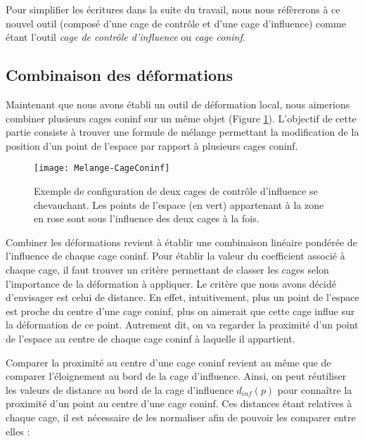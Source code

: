 Pour simplifier les écritures dans la suite du travail, nous nous réfèrerons à
ce nouvel outil (composé d'une cage de contrôle et d'une cage d'influence)
comme étant l'outil \textit{cage de contrôle d'influence} ou \textit{cage
coninf}.

\subsection{Combinaison des déformations}

Maintenant que nous avons établi un outil de déformation local, nous aimerions
combiner plusieurs cages coninf sur un même objet (Figure \ref{MELMC}).
L'objectif de cette partie consiste à trouver une formule de mélange
permettant la modification de la position d'un point de l'espace par rapport à
plusieurs cages coninf.

\begin{figure}[ht]
  \begin{center}
    \texttt{[image: Melange-CageConinf]}

    \caption{Exemple de configuration de deux cages de contrôle d'influence se
chevauchant. Les points de l'espace (en vert) appartenant à la zone en rose
sont sous l'influence des deux cages à la fois.}

    \label{MELMC}
  \end{center}
\end{figure}

Combiner les déformations revient à établir une combinaison linéaire pondérée
de l'influence de chaque cage coninf. Pour établir la valeur du coefficient
associé à chaque cage, il faut trouver un critère permettant de classer les
cages selon l'importance de la déformation à appliquer. Le critère que nous
avons décidé d'envisager est celui de distance. En effet, intuitivement, plus
un point de l'espace est proche du centre d'une cage coninf, plus on aimerait
que cette cage influe sur la déformation de ce point. Autrement dit, on va
regarder la proximité d'un point de l'espace au centre de chaque cage coninf
à laquelle il appartient.

Comparer la proximité au centre d'une cage coninf revient au même que de
comparer l'éloignement au bord de la cage d'influence. Ainsi, on peut
réutiliser les valeurs de distance au bord de la cage d'influence $d_{inf}(p)$
pour connaître la proximité d'un point au centre d'une cage coninf. Ces
distances étant relatives à chaque cage, il est nécessaire de les normaliser
afin de pouvoir les comparer entre elles :


